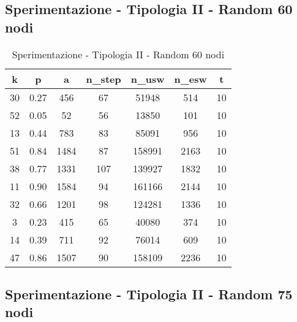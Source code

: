 \subsection{Sperimentazione - Tipologia II - Random 60 nodi}

\begin{table}[H]
\centering
\begin{tabular}{|c|c|c|c|c|c|c|}
\hline
\textbf{k} & \textbf{p} & \textbf{a} & \textbf{n\_step} & \textbf{n\_usw} & \textbf{n\_esw} & \textbf{t} \\ \hline
30 & 0.27 & 456 & 67 & 51948 & 514 & 10 \\ \hline
52 & 0.05 & 52 & 56 & 13850 & 101 & 10 \\ \hline
13 & 0.44 & 783 & 83 & 85091 & 956 & 10 \\ \hline
51 & 0.84 & 1484 & 87 & 158991 & 2163 & 10 \\ \hline
38 & 0.77 & 1331 & 107 & 139927 & 1832 & 10 \\ \hline
11 & 0.90 & 1584 & 94 & 161166 & 2144 & 10 \\ \hline
32 & 0.66 & 1201 & 98 & 124281 & 1336 & 10 \\ \hline
3 & 0.23 & 415 & 65 & 40080 & 374 & 10 \\ \hline
14 & 0.39 & 711 & 92 & 76014 & 609 & 10 \\ \hline
47 & 0.86 & 1507 & 90 & 158109 & 2236 & 10 \\ \hline
\end{tabular}
\caption{Sperimentazione - Tipologia II - Random 60 nodi}
\label{tab:sperimentazione-tipo1-60nodi}
\end{table}

\subsection{Sperimentazione - Tipologia II - Random 75 nodi}

